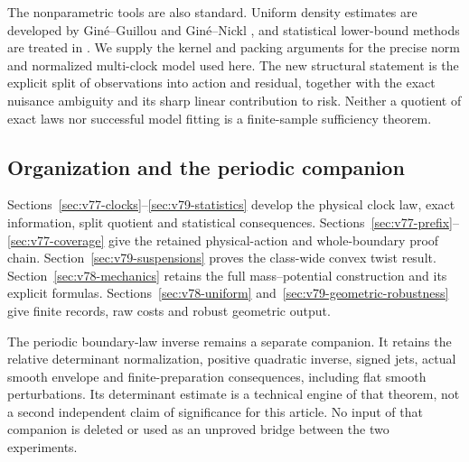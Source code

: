 The nonparametric tools are also standard.  Uniform density estimates
are developed by Gin\'e--Guillou \cite{GineGuillou2002} and
Gin\'e--Nickl \cite{GineNickl2009}, and statistical lower-bound methods
are treated in \cite{Tsybakov2009}.  We supply the kernel and packing
arguments for the precise norm and normalized multi-clock model used
here.  The new structural statement is the explicit split of observations
into action and residual, together with the exact nuisance ambiguity
and its sharp linear contribution to risk.  Neither a quotient of exact
laws nor successful model fitting is a finite-sample sufficiency theorem.

\subsection{Organization and the periodic companion}
Sections~\ref{sec:v77-clocks}--\ref{sec:v79-statistics} develop the
physical clock law, exact information, split quotient and statistical
consequences.  Sections~\ref{sec:v77-prefix}--\ref{sec:v77-coverage}
give the retained physical-action and whole-boundary proof chain.
Section~\ref{sec:v79-suspensions} proves the class-wide convex twist
result.  Section~\ref{sec:v78-mechanics} retains the full mass--potential
construction and its explicit formulas.  Sections~\ref{sec:v78-uniform}
and~\ref{sec:v79-geometric-robustness} give finite records, raw costs and
robust geometric output.

The periodic boundary-law inverse remains a separate companion.  It
retains the relative determinant normalization, positive quadratic
inverse, signed jets, actual smooth envelope and finite-preparation
consequences, including flat smooth perturbations.  Its determinant
estimate is a technical engine of that theorem, not a second independent
claim of significance for this article.  No input of that companion is
deleted or used as an unproved bridge between the two experiments.
